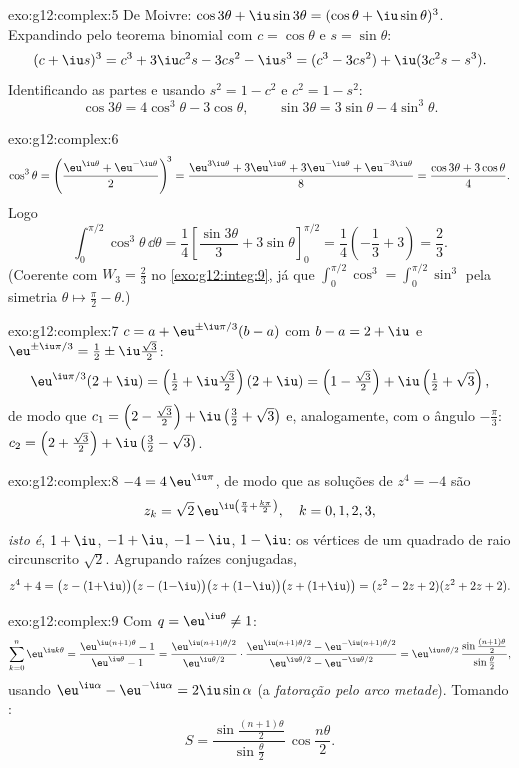 \begin{solution}{exo:g12:complex:5}
De Moivre:
$\cos3\theta + \iu\sin3\theta = (\cos\theta + \iu\sin\theta)^3$.
Expandindo pelo teorema binomial com $c = \cos\theta$ e
$s = \sin\theta$:
\[
(c + \iu s)^3 = c^3 + 3\iu c^2 s - 3 c s^2 - \iu s^3
= (c^3 - 3cs^2) + \iu(3c^2 s - s^3).
\]
Identificando as partes e usando $s^2 = 1 - c^2$ e $c^2 = 1 - s^2$:
\[
\cos3\theta = 4\cos^3\theta - 3\cos\theta,
\qquad
\sin3\theta = 3\sin\theta - 4\sin^3\theta .
\]
\end{solution}

\begin{solution}{exo:g12:complex:6}
\[
\cos^3\theta = \left(\frac{\eu^{\iu\theta} + \eu^{-\iu\theta}}{2}\right)^{\!3}
= \frac{\eu^{3\iu\theta} + 3\eu^{\iu\theta} + 3\eu^{-\iu\theta} + \eu^{-3\iu\theta}}{8}
= \frac{\cos3\theta + 3\cos\theta}{4}.
\]
Logo
\[
\int_0^{\pi/2}\cos^3\theta\,\dd\theta
= \frac14\left[\frac{\sin3\theta}{3} + 3\sin\theta\right]_0^{\pi/2}
= \frac14\left(-\frac13 + 3\right) = \frac{2}{3}.
\]
(Coerente com $W_3 = \frac23$ no \cref{exo:g12:integ:9}, já que
$\int_0^{\pi/2}\cos^3 = \int_0^{\pi/2}\sin^3$ pela simetria
$\theta \mapsto \frac\pi2 - \theta$.)
\end{solution}

\begin{solution}{exo:g12:complex:7}
$c = a + \eu^{\pm\iu\pi/3}(b - a)$ com $b - a = 2 + \iu$ e
$\eu^{\pm\iu\pi/3} = \frac12 \pm \iu\frac{\sqrt3}{2}$:
\[
\eu^{\iu\pi/3}(2+\iu) = \left(\tfrac12 + \iu\tfrac{\sqrt3}{2}\right)(2+\iu)
= \left(1 - \tfrac{\sqrt3}{2}\right) + \iu\left(\tfrac12 + \sqrt3\right),
\]
de modo que $c_1 = \left(2 - \frac{\sqrt3}{2}\right) +
\iu\left(\frac32 + \sqrt3\right)$ e, analogamente, com o ângulo
$-\frac\pi3$:
$c_2 = \left(2 + \frac{\sqrt3}{2}\right) +
\iu\left(\frac32 - \sqrt3\right)$.
\end{solution}

\begin{solution}{exo:g12:complex:8}
$-4 = 4\,\eu^{\iu\pi}$, de modo que as soluções de $z^4 = -4$ são
\[
z_k = \sqrt2\,\eu^{\iu\left(\frac\pi4 + \frac{k\pi}{2}\right)},
\quad k = 0, 1, 2, 3,
\]
\emph{isto é}, $1 + \iu$, $-1 + \iu$, $-1 - \iu$, $1 - \iu$: os vértices
de um quadrado de raio circunscrito $\sqrt 2$. Agrupando raízes
conjugadas,
\[
z^4 + 4 = \bigl(z - (1{+}\iu)\bigr)\bigl(z - (1{-}\iu)\bigr)
\bigl(z + (1{-}\iu)\bigr)\bigl(z + (1{+}\iu)\bigr)
= (z^2 - 2z + 2)(z^2 + 2z + 2).
\]
\end{solution}

\begin{solution}{exo:g12:complex:9}
Com $q = \eu^{\iu\theta} \neq 1$:
\[
\sum_{k=0}^{n} \eu^{\iu k\theta} = \frac{\eu^{\iu(n+1)\theta} - 1}{\eu^{\iu\theta} - 1}
= \frac{\eu^{\iu(n+1)\theta/2}}{\eu^{\iu\theta/2}}
\cdot\frac{\eu^{\iu(n+1)\theta/2} - \eu^{-\iu(n+1)\theta/2}}{\eu^{\iu\theta/2} - \eu^{-\iu\theta/2}}
= \eu^{\iu n\theta/2}\,
\frac{\sin\frac{(n+1)\theta}{2}}{\sin\frac{\theta}{2}},
\]
usando $\eu^{\iu\alpha} - \eu^{-\iu\alpha} = 2\iu\sin\alpha$ (a
\emph{fatoração pelo arco metade}). Tomando :
\[
S = \frac{\sin\frac{(n+1)\theta}{2}}{\sin\frac{\theta}{2}}\,
\cos\frac{n\theta}{2}.
\]
\end{solution}

